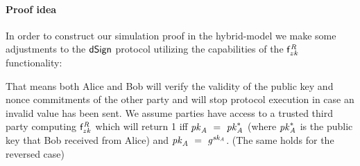 \paragraph{Proof idea} In order to construct our simulation proof in the hybrid-model we make some adjustments to the $\mathsf{dSign}$ protocol utilizing the capabilities of the $\mathsf{f}^{\mathit{R}}_{zk}$ functionality:
\begin{center}
\end{center}

That means both Alice and Bob will verify the validity of the public key and nonce commitments of the other party and will stop protocol execution in case an invalid value has been sent.
We assume parties have access to a trusted third party computing $\mathsf{f}^{\mathit{R}}_{zk}$ which will return 1 iff $\mathit{pk}_{\mathit{A}} ~=~ \mathit{pk}_{\mathit{A}}^*$ (where $\mathit{pk}_{\mathit{A}}^*$ is the public key that Bob received from Alice) and $\mathit{pk}_{\mathit{A}} ~=~ \mathit{g}^{\mathit{sk}_{\mathit{A}}}$. (The same holds for the reversed case)

